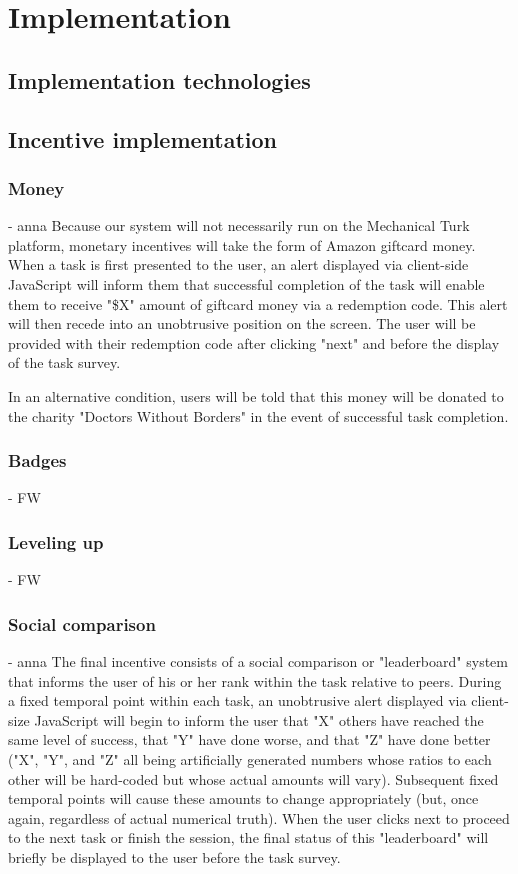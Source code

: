 \section{Implementation}


\subsection{Implementation technologies}

\subsection{Incentive implementation}
\subsubsection{Money} - anna
Because our system will not necessarily run on the Mechanical Turk platform, monetary incentives will take the form of Amazon giftcard money. When a task is first presented to the user, an alert displayed via client-side JavaScript will inform them that successful completion of the task will enable them to receive "\$X" amount of giftcard money via a redemption code. This alert will then recede into an unobtrusive position on the screen. The user will be provided with their redemption code after clicking "next" and before the display of the task survey.

In an alternative condition, users will be told that this money will be donated to the charity "Doctors Without Borders" in the event of successful task completion.
\subsubsection{Badges} - FW
\subsubsection{Leveling up} - FW
\subsubsection{Social comparison} - anna
The final incentive consists of a social comparison or "leaderboard" system that informs the user of his or her rank within the task relative to peers. During a fixed temporal point within each task, an unobtrusive alert displayed via client-size JavaScript will begin to inform the user that "X" others have reached the same level of success, that "Y" have done worse, and that "Z" have done better ("X", "Y", and "Z" all being artificially generated numbers whose ratios to each other will be hard-coded but whose actual amounts will vary). Subsequent fixed temporal points will cause these amounts to change appropriately (but, once again, regardless of actual numerical truth). When the user clicks next to proceed to the next task or finish the session, the final status of this "leaderboard" will briefly be displayed to the user before the task survey.
